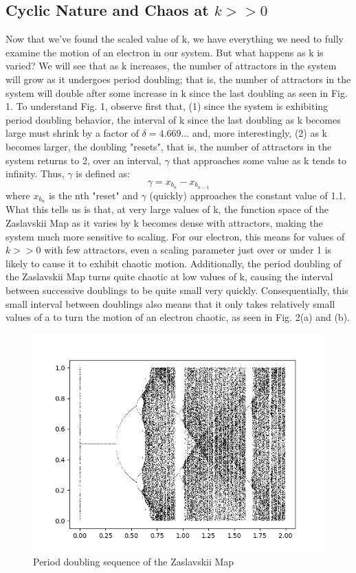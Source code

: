 \documentclass{article}
\begin{document}
\subsection{Cyclic Nature and Chaos at $k >> 0$}
Now that we've found the scaled value of k, we have everything we need to fully examine the motion of an electron in our system. But what happens as k is varied? We will see that as k increases, the number of attractors in the system will grow as it undergoes period doubling; that is, the number of attractors in the system will double after some increase in k since the last doubling as seen in Fig. 1. To understand Fig. 1, observe first that, (1) since the system is exhibiting period doubling behavior, the interval of k since the last doubling as k becomes large must shrink by a factor of $\delta = 4.669...$\cite{ocp5} and, more interestingly, (2) as k becomes larger, the doubling "resets", that is, the number of attractors in the system returns to 2, over an interval, $\gamma$ that approaches some value as k tends to infinity. Thus, $\gamma$ is defined as:
$$\gamma = x_{b_{n}} - x_{b_{n-1}}$$
where $x_{b_{n}}$ is the nth "reset" and $\gamma$ (quickly) approaches the constant value of 1.1.
What this tells us is that, at very large values of k, the function space of the Zaslavskii Map as it varies by k becomes dense with attractors, making the system much more sensitive to scaling. For our electron, this means for values of $k >> 0$ with few attractors, even a scaling parameter just over or under 1 is likely to cause it to exhibit chaotic motion. Additionally, the period doubling of the Zaslavskii Map turns quite chaotic at low values of k, causing the interval between successive doublings to be quite small very quickly. Consequentially, this small interval between doublings also means that it only takes relatively small values of a to turn the motion of an electron chaotic, as seen in Fig. 2(a) and (b).

\begin{figure}[t!]
\label{Fig. 2}
\includegraphics[scale=1]{Logistic_Graph}
\caption{Period doubling sequence of the Zaslavskii Map}
\end{figure}
\end{document}
